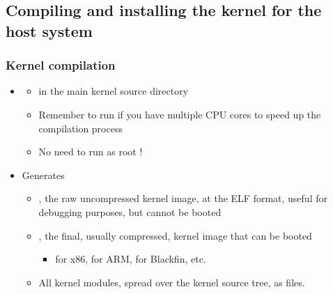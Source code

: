 \subsection[Installation on the host]{Compiling and installing the
  kernel for the host system}

\begin{frame}
  \frametitle{Kernel compilation}
  \begin{itemize}
  \item {}
    \begin{itemize}
    \item in the main kernel source directory
    \item Remember to run  if you have multiple CPU
      cores to speed up the compilation process
    \item No need to run as root !
    \end{itemize}
  \item Generates
    \begin{itemize}
    \item {}, the raw uncompressed kernel image, at the
      ELF format, useful for debugging purposes, but cannot be booted
    \item {}, the final, usually
      compressed, kernel image that can be booted
      \begin{itemize}
      \item {} for x86,  for ARM,
         for Blackfin, etc.
      \end{itemize}
    \item All kernel modules, spread over the kernel source tree, as
       files.
    \end{itemize}
  \end{itemize}
\end{frame}

